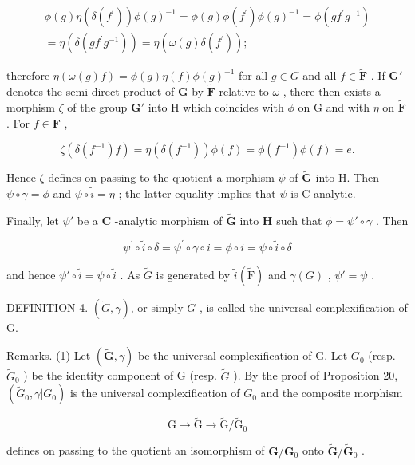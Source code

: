 \[
\begin{array}{r} \phi (g) \eta (\delta (f ^ {\prime})) \phi (g) ^ {- 1} = \phi (g) \phi (f ^ {\prime}) \phi (g) ^ {- 1} = \phi (g f ^ {\prime} g ^ {- 1}) \\ = \eta (\delta (g f ^ {\prime} g ^ {- 1})) = \eta (\omega (g) \delta (f ^ {\prime})); \end{array}
\]

therefore \(\eta (\omega (g)f) = \phi (g)\eta (f)\phi (g)^{-1}\) for all \(g\in G\) and all \(f\in \tilde{\mathbf{F}}\) . If \(\mathbf{G}'\) denotes the semi-direct product of \(\mathbf{G}\) by \(\tilde{\mathbf{F}}\) relative to \(\omega\) , there then exists a morphism \(\zeta\) of the group \(\mathbf{G}'\) into \(\mathrm{H}\) which coincides with \(\phi\) on \(\mathrm{G}\) and with \(\eta\) on \(\tilde{\mathbf{F}}\) . For \(f\in \mathbf{F}\) ,

\[
\zeta (\delta (f ^ {- 1}) f) = \eta (\delta (f ^ {- 1})) \phi (f) = \phi (f ^ {- 1}) \phi (f) = e.
\]

Hence \(\zeta\) defines on passing to the quotient a morphism \(\psi\) of \(\tilde{\mathbf{G}}\) into H. Then \(\psi \circ \gamma = \phi\) and \(\psi \circ \tilde{i} = \eta\) ; the latter equality implies that \(\psi\) is C-analytic.

Finally, let \(\psi'\) be a \(\mathbf{C}\) -analytic morphism of \(\tilde{\mathbf{G}}\) into \(\mathbf{H}\) such that \(\phi = \psi' \circ \gamma\) . Then

\[
\psi^ {\prime} \circ \tilde {i} \circ \delta = \psi^ {\prime} \circ \gamma \circ i = \phi \circ i = \psi \circ \tilde {i} \circ \delta
\]

and hence \(\psi' \circ \tilde{i} = \psi \circ \tilde{i}\) . As \(\tilde{G}\) is generated by \(\tilde{i}(\tilde{\mathrm{F}})\) and \(\gamma(G)\) , \(\psi' = \psi\) .

DEFINITION 4. \((\tilde{G},\gamma)\), or simply \(\tilde{G}\) , is called the universal complexification of G.

Remarks. (1) Let \((\tilde{\mathbf{G}},\gamma)\) be the universal complexification of G. Let \(G_0\) (resp. \(\tilde{G}_0\) ) be the identity component of G (resp. \(\tilde{G}\) ). By the proof of Proposition 20, \((\tilde{G}_0,\gamma |G_0)\) is the universal complexification of \(G_0\) and the composite morphism

\[
\mathrm{G} \rightarrow \tilde {\mathrm{G}} \rightarrow \tilde {\mathrm{G}} / \tilde {\mathrm{G}} _ {0}
\]

defines on passing to the quotient an isomorphism of \(\mathbf{G} / \mathbf{G}_0\) onto \(\tilde{\mathbf{G}} / \tilde{\mathbf{G}}_0\) .

